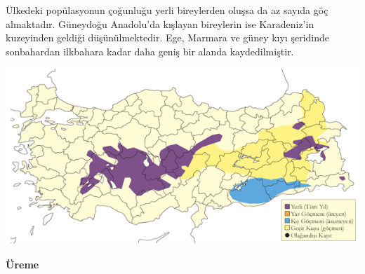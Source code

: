\documentclass[
  a4paper,
  DIV=11,
  numbers=noendperiod]{scrreprt}
\begin{document}
Ülkedeki popülasyonun çoğunluğu yerli bireylerden oluşsa da az sayıda
göç almaktadır. Güneydoğu Anadolu'da kışlayan bireylerin ise
Karadeniz'in kuzeyinden geldiği düşünülmektedir. Ege, Marmara ve güney
kıyı şeridinde sonbahardan ilkbahara kadar daha geniş bir alanda
kaydedilmiştir.

\includegraphics{images/harita_Page_112.png}

\textbf{Üreme}
\end{document}
